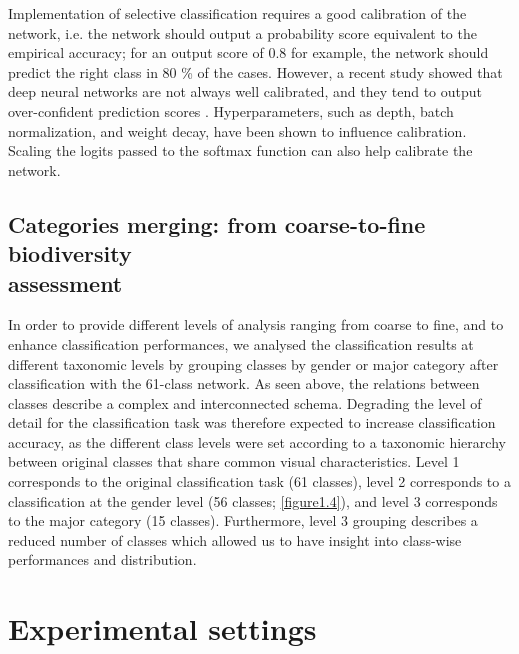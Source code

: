 Implementation of selective classification requires a good calibration of the network, i.e. the network should output a probability score equivalent to the empirical accuracy; for an output score of 0.8 for example, the network should predict the right class in 80 \% of the cases. However, a recent study showed that deep neural networks are not always well calibrated, and they tend to output over-confident prediction scores \citep{guo_calibration_2017}. Hyperparameters, such as depth, batch normalization, and weight decay, have been shown to influence calibration. Scaling the logits passed to the softmax function can also help calibrate the network.


\subsection{Categories merging: from coarse-to-fine biodiversity \\ assessment}\label{chapitre1_4.5}
In order to provide different levels of analysis ranging from coarse to fine, and to enhance classification performances, we analysed the classification results at different taxonomic levels by grouping classes by gender or major category after classification with the 61-class network. As seen above, the relations between classes describe a complex and interconnected schema. Degrading the level of detail for the classification task was therefore expected to increase classification accuracy, as the different class levels were set according to a taxonomic hierarchy between original classes that share common visual characteristics. Level 1 corresponds to the original classification task (61 classes), level 2 corresponds to a classification at the gender level (56 classes; \autoref{figure1.4}), and level 3 corresponds to the major category (15 classes). Furthermore, level 3 grouping describes a reduced number of classes which allowed us to have insight into class-wise performances and distribution.

\section{Experimental settings}\label{chapitre1_5}

